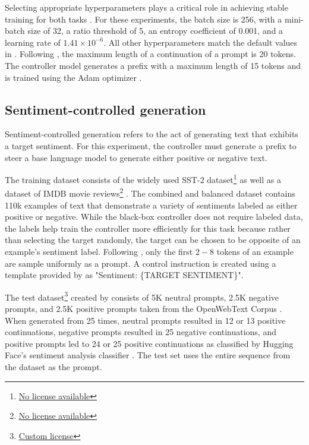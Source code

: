 \documentclass[phd,electronic,oneside,twosidetoc,letterpaper,chaptercenter,parttop,lof]{byumsphd}
\begin{document}
Selecting appropriate hyperparameters plays a critical role in achieving stable training for both tasks
\citet{ziegler2019preferences}. For these experiments, the batch size is 256, with a mini-batch size of 32, a ratio threshold of 5, an entropy coefficient of 0.001, and a learning rate of \(1.41 \times 10^{-6}\). All other hyperparameters match the default values in \citet{vonwerra2022trl}.
Following \citet{liu2021dexpert}, the maximum length of a continuation of a prompt is 20 tokens.
The controller model generates a prefix with a maximum length of 15 tokens and is trained using the Adam optimizer \citep{kingma2017adam}.

\subsection{Sentiment-controlled generation}

Sentiment-controlled generation refers to the act of generating text that exhibits a target sentiment.
For this experiment, the controller must generate a prefix to steer a base language model to generate either positive or negative text.

The training dataset consists of the widely used SST-2 dataset\footnote{\href{https://huggingface.co/datasets/stanfordnlp/sst2}{No license available}} \cite{socher2013sst5} as well as a dataset of IMDB movie reviews\footnote{\href{https://huggingface.co/datasets/stanfordnlp/imdb}{No license available}} \cite{maas2011imdb}.
The combined and balanced dataset contains 110k examples of text that demonstrate a variety of sentiments labeled as either positive or negative.
While the black-box controller does not require labeled data, the labels help train the controller more efficiently for this task because rather than selecting the target randomly, the target can be chosen to be opposite of an example's sentiment label.
Following \citet{vonwerra2022trl}, only the first $2-8$ tokens of an example are sample uniformly as a prompt. A control instruction is created using a template provided by \citet{zhang2023rmt} as \break "Sentiment: \{TARGET SENTIMENT\}".

The test dataset\footnote{\href{https://skylion007.github.io/OpenWebTextCorpus/}{Custom license}} created by \citet{liu2021dexpert} consists of 5K neutral prompts, 2.5K negative prompts, and 2.5K positive prompts taken from the OpenWebText Corpus \cite{Gokaslan2019OpenWeb}. 
When generated from 25 times, neutral prompts resulted in 12 or 13 positive continuations, negative prompts resulted in 25 negative continuations, and positive prompts led to 24 or 25 positive continuations as classified by Hugging Face's sentiment analysis classifier \cite{wolf2020huggingface}.
The test set uses the entire sequence from the dataset as the prompt.
\end{document}
